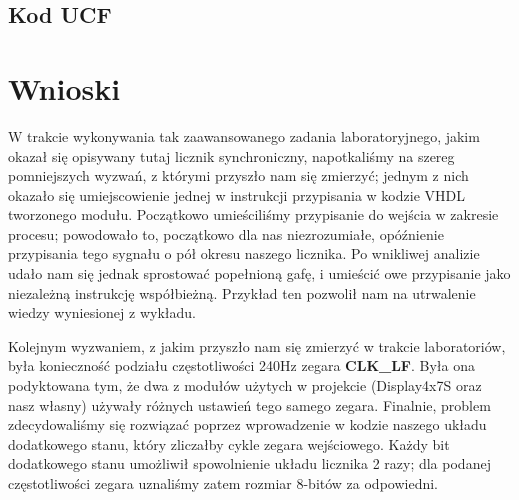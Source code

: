 \documentclass[a4paper,12pt]{extarticle}  %
\begin{document}
\subsection{Kod UCF}



\section{Wnioski}


W trakcie wykonywania tak zaawansowanego zadania laboratoryjnego, jakim okazał się opisywany tutaj licznik synchroniczny, napotkaliśmy na szereg pomniejszych wyzwań, z którymi przyszło nam się zmierzyć; jednym z nich okazało się umiejscowienie jednej w instrukcji przypisania w kodzie VHDL tworzonego modułu. Początkowo umieściliśmy przypisanie do wejścia w zakresie procesu; powodowało to, początkowo dla nas niezrozumiałe, opóźnienie przypisania tego sygnału o pół okresu naszego licznika. Po wnikliwej analizie udało nam się jednak sprostować popełnioną gafę, i umieścić owe przypisanie jako niezależną instrukcję współbieżną. Przykład ten pozwolił nam na utrwalenie wiedzy wyniesionej z wykładu.

Kolejnym wyzwaniem, z jakim przyszło nam się zmierzyć w trakcie laboratoriów, była konieczność podziału częstotliwości 240Hz zegara \textbf{CLK\_LF}. Była ona podyktowana tym, że dwa z modułów użytych w projekcie (Display4x7S oraz nasz własny) używały różnych ustawień tego samego zegara. %
Finalnie, problem zdecydowaliśmy się rozwiązać poprzez wprowadzenie w kodzie naszego układu dodatkowego stanu, który zliczałby cykle zegara wejściowego. Każdy bit dodatkowego stanu umożliwił spowolnienie układu licznika 2 razy; dla podanej częstotliwości zegara uznaliśmy zatem rozmiar 8-bitów za odpowiedni.
\end{document}
